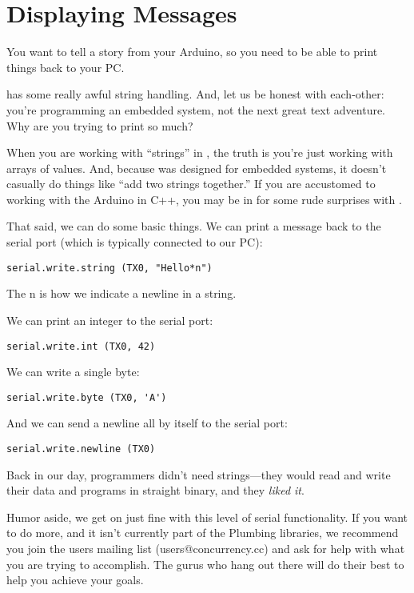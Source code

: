 \section{Displaying Messages}
\problem
You want to tell a story from your Arduino, so you need to be able to print things back to your PC.

\solution
\occam has some really awful string handling. And, let us be honest with each-other: you're programming an embedded system, not the next great text adventure. Why are you trying to print so much?

When you are working with ``strings'' in \occam, the truth is you're just working with arrays of \BYTE values. And, because \occam was designed for embedded systems, it doesn't casually do things like ``add two strings together.'' If you are accustomed to working with the Arduino in C++, you may be in for some rude surprises with \occam. 

That said, we can do some basic things. We can print a message back to the serial port (which is typically connected to our PC):

\begin{lstlisting}
serial.write.string (TX0, "Hello*n")
\end{lstlisting}

The {\code *n} is how we indicate a newline in a string. 

We can print an integer to the serial port:

\begin{lstlisting}
serial.write.int (TX0, 42)
\end{lstlisting}

We can write a single byte:

\begin{lstlisting}
serial.write.byte (TX0, 'A')
\end{lstlisting}

And we can send a newline all by itself to the serial port:

\begin{lstlisting}
serial.write.newline (TX0)
\end{lstlisting}

\discussion
Back in our day, programmers didn't need strings---they would read and write their data and programs in straight binary, and they \emph{liked it}.

Humor aside, we get on just fine with this level of serial functionality. If you want to do more, and it isn't currently part of the Plumbing libraries, we recommend you join the users mailing list ({\code users@concurrency.cc}) and ask for help with what you are trying to accomplish. The \occam gurus who hang out there will do their best to help you achieve your goals.

\makingthingsbreak

\XXX

\seealso

\XXX